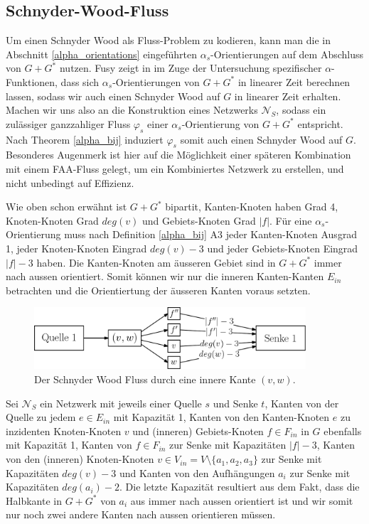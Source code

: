 \subsection{Schnyder-Wood-Fluss}

Um einen Schnyder Wood als Fluss-Problem zu kodieren, kann man die in Abschnitt \ref{alpha_orientations} eingeführten $\alpha_s$-Orientierungen auf dem Abschluss von $G+G^*$ nutzen. Fusy zeigt in \cite{fusy07} im Zuge der Untersuchung spezifischer $\alpha$-Funktionen, dass sich $\alpha_s$-Orientierungen von $G+G^*$ in linearer Zeit berechnen lassen, sodass wir auch einen Schnyder Wood auf $G$ in linearer Zeit erhalten.\\

Machen wir uns also an die Konstruktion eines Netzwerks $\mathcal{N}_S$, sodass ein zulässiger ganzzahliger Fluss $\varphi_s$ einer $\alpha_s$-Orientierung von $G+G^*$ entspricht. Nach Theorem \ref{alpha_bij} induziert $\varphi_s$ somit auch einen Schnyder Wood auf $G$. Besonderes Augenmerk ist hier auf die Möglichkeit einer späteren Kombination mit einem FAA-Fluss gelegt, um ein Kombiniertes Netzwerk zu erstellen, und nicht unbedingt auf Effizienz.

Wie oben schon erwähnt ist $G+G^*$ bipartit, Kanten-Knoten haben Grad 4, Knoten-Knoten Grad $deg(v)$ und Gebiets-Knoten Grad $|f|$. Für eine $\alpha_s$-Orientierung muss nach Definition \ref{alpha_bij} A3 jeder Kanten-Knoten Ausgrad 1, jeder Knoten-Knoten Eingrad $deg(v)-3$ und jeder Gebiets-Knoten Eingrad $|f|-3$ haben. Die Kanten-Knoten am äusseren Gebiet sind in $G+G^*$ immer nach aussen orientiert. Somit können wir nur die inneren Kanten-Kanten $E_{in}$ betrachten und die Orientiertung der äusseren Kanten voraus setzten.

\begin{figure}[h]
	\centering
  \includegraphics[width=0.9\textwidth]{schnyder_flow.png}
  \caption{Der Schnyder Wood Fluss durch eine innere Kante $(v,w)$.}
  \label{schnyder_flow}
\end{figure}

Sei $\mathcal{N}_S$ ein Netzwerk mit jeweils einer Quelle $s$ und Senke $t$, Kanten von der Quelle zu jedem $e \in E_{in}$ mit Kapazität 1, Kanten von den Kanten-Knoten $e$ zu inzidenten Knoten-Knoten $v$ und (inneren) Gebiets-Knoten $f \in F_{in}$ in $G$ ebenfalls mit Kapazität 1, Kanten von $f \in F_{in}$ zur Senke mit Kapazitäten $|f|-3$, Kanten von den (inneren) Knoten-Knoten $v \in V_{in} = V \setminus \{a_1,a_2,a_3\}$ zur Senke mit Kapazitäten $deg(v)-3$ und Kanten von den Aufhängungen $a_i$ zur Senke mit Kapazitäten $deg(a_i)-2$. Die letzte Kapazität resultiert aus dem Fakt, dass die Halbkante in $G+G^*$ von $a_i$ aus immer nach aussen orientiert ist und wir somit nur noch zwei andere Kanten nach aussen orientieren müssen.

